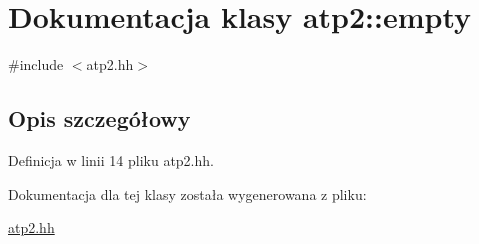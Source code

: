 \hypertarget{classatp2_1_1empty}{}\section{Dokumentacja klasy atp2\+:\+:empty}
\label{classatp2_1_1empty}


{\ttfamily \#include $<$atp2.\+hh$>$}



\subsection{Opis szczegółowy}


Definicja w linii 14 pliku atp2.\+hh.



Dokumentacja dla tej klasy została wygenerowana z pliku\+:\begin{DoxyCompactItemize}
\item 
\hyperlink{atp2_8hh}{atp2.\+hh}\end{DoxyCompactItemize}
